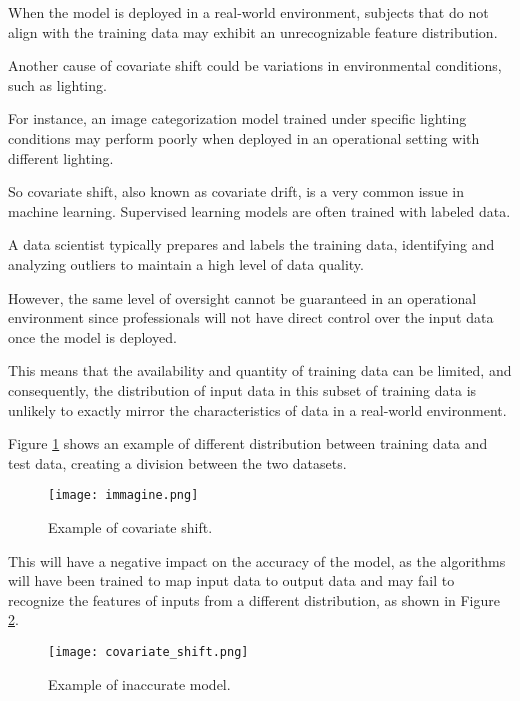 When the model is deployed in a real-world environment, subjects that do not align with the training data may exhibit an unrecognizable feature distribution. 

Another cause of covariate shift could be variations in environmental conditions, such as lighting.

For instance, an image categorization model trained under specific lighting conditions may perform poorly when deployed in an operational setting with different lighting.
	
	\vspace{0.5cm}
	
So covariate shift, also known as covariate drift, is a very common issue in machine learning. Supervised learning models are often trained with labeled data. 

A data scientist typically prepares and labels the training data, identifying and analyzing outliers to maintain a high level of data quality.

However, the same level of oversight cannot be guaranteed in an operational environment since professionals will not have direct control over the input data once the model is deployed.

This means that the availability and quantity of training data can be limited, and consequently, the distribution of input data in this subset of training data is unlikely to exactly mirror the characteristics of data in a real-world environment.

Figure \ref{covariate-shift} shows an example of different distribution between training data and test data, creating a division between the two datasets.  
	

	\begin{figure}[h!]
		\centering
		\texttt{[image: immagine.png]} 
		\caption{Example of covariate shift.}
		\label{covariate-shift}
	\end{figure}

	
This will have a negative impact on the accuracy of the model, as the algorithms will have been trained to map input data to output data and may fail to recognize the features of inputs from a different distribution, as shown in Figure \ref{inaccurate-model}.  
	

	\begin{figure}[h!]
		\centering
		\texttt{[image: covariate\_shift.png]} 
		\caption{Example of inaccurate model.}
		\label{inaccurate-model}
	\end{figure}  

